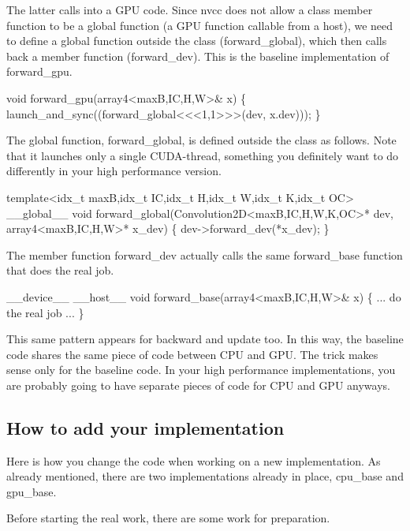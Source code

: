 The latter calls into a G\+PU code. Since nvcc does not allow a class member function to be a global function (a G\+PU function callable from a host), we need to define a global function outside the class (forward\+\_\+global), which then calls back a member function (forward\+\_\+dev). This is the baseline implementation of forward\+\_\+gpu.


\begin{DoxyCode}
void forward\_gpu(array4<maxB,IC,H,W>& x) \{
  launch\_and\_sync((forward\_global<<<1,1>>>(dev, x.dev)));
\}
\end{DoxyCode}


The global function, forward\+\_\+global, is defined outside the class as follows. Note that it launches only a single C\+U\+D\+A-\/thread, something you definitely want to do differently in your high performance version.


\begin{DoxyCode}
template<idx\_t maxB,idx\_t IC,idx\_t H,idx\_t W,idx\_t K,idx\_t OC>
\_\_global\_\_ void forward\_global(Convolution2D<maxB,IC,H,W,K,OC>* dev,
                               array4<maxB,IC,H,W>* x\_dev) \{
  dev->forward\_dev(*x\_dev);
\}
\end{DoxyCode}


The member function forward\+\_\+dev actually calls the same forward\+\_\+base function that does the real job.


\begin{DoxyCode}
\_\_device\_\_ \_\_host\_\_ 
void forward\_base(array4<maxB,IC,H,W>& x) \{
  ... do the real job ...
\}
\end{DoxyCode}


This same pattern appears for backward and update too. In this way, the baseline code shares the same piece of code between C\+PU and G\+PU. The trick makes sense only for the baseline code. In your high performance implementations, you are probably going to have separate pieces of code for C\+PU and G\+PU anyways.

\subsection*{How to add your implementation }

Here is how you change the code when working on a new implementation. As already mentioned, there are two implementations already in place, cpu\+\_\+base and gpu\+\_\+base.

Before starting the real work, there are some work for preparation.


